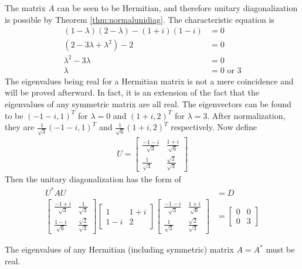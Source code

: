 \begin{solution}
The matrix $A$ can be seen to be Hermitian, and therefore unitary diagonalization is possible by Theorem \ref{thm:normalunidiag}. The characteristic equation is 
\begin{align*}
(1-\lambda)(2-\lambda) - (1+i)(1-i) &= 0 \\
(2 - 3\lambda + \lambda^2) - 2 &= 0 \\
\lambda^2 - 3\lambda &= 0 \\
\lambda &= 0 \text{ or } 3
\end{align*}
The eigenvalues being real for a Hermitian matrix is not a mere coincidence and will be proved afterward. In fact, it is an extension of the fact that the eigenvalues of any symmetric matrix are all real. The eigenvectors can be found to be $(-1-i, 1)^T$ for $\lambda = 0$ and $(1+i, 2)^T$ for $\lambda = 3$. After normalization, they are $\frac{1}{\sqrt{3}}(-1-i, 1)^T$ and $\frac{1}{\sqrt{6}}(1+i, 2)^T$ respectively. Now define
\begin{align*}
U =
\begin{bmatrix}
\frac{-1-i}{\sqrt{3}} & \frac{1+i}{\sqrt{6}} \\
\frac{1}{\sqrt{3}} & \frac{\sqrt{2}}{\sqrt{3}}
\end{bmatrix}
\end{align*}
Then the unitary diagonalization has the form of
\begin{align*}
U^* AU &= D \\
\begin{bmatrix}
\frac{-1+i}{\sqrt{3}} & \frac{1}{\sqrt{3}} \\
\frac{1-i}{\sqrt{6}} & \frac{\sqrt{2}}{\sqrt{3}}
\end{bmatrix}
\begin{bmatrix}
1 & 1+i \\
1-i & 2
\end{bmatrix}
\begin{bmatrix}
\frac{-1-i}{\sqrt{3}} & \frac{1+i}{\sqrt{6}} \\
\frac{1}{\sqrt{3}} & \frac{\sqrt{2}}{\sqrt{3}}
\end{bmatrix}
&=
\begin{bmatrix}
0 & 0 \\
0 & 3
\end{bmatrix}
\end{align*}
\end{solution}
\begin{proper}
\label{proper:hermrealeig}
The eigenvalues of any Hermitian (including symmetric) matrix $A = A^*$ must be real.
\end{proper}
